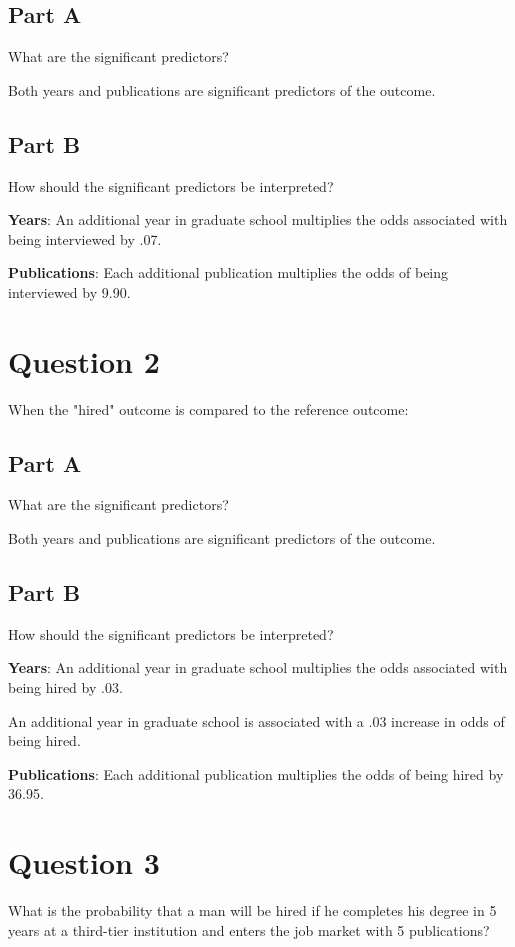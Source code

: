 \documentclass{article}\usepackage[]{graphicx}\usepackage[]{color}
\begin{document}
\subsection{Part A}
What are the significant predictors?

Both years and publications are significant predictors of the outcome. 

\subsection{Part B}
How should the significant predictors be interpreted?

\textbf{Years}: An additional year in graduate school multiplies the odds associated with being interviewed by .07.

\textbf{Publications}: Each additional publication multiplies the odds of being interviewed by 9.90.

\section{Question 2}
When the "hired" outcome is compared to the reference outcome: 

\subsection{Part A}
What are the significant predictors?

Both years and publications are significant predictors of the outcome. 

\subsection{Part B}
How should the significant predictors be interpreted?

\textbf{Years}: An additional year in graduate school multiplies the odds associated with being hired by .03. 

An additional year in graduate school is associated with a .03 increase in odds of being hired.

\textbf{Publications}: Each additional publication multiplies the odds of being hired by 36.95. 

\section{Question 3}
What is the probability that a man will be hired if he completes his degree in 5 years at a third-tier institution and enters the job market with 5 publications?
\end{document}
